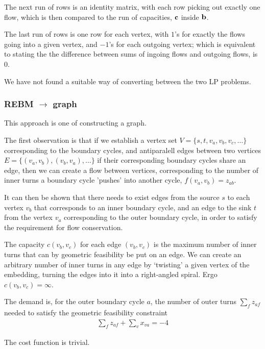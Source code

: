 The next run of rows is an identity matrix, with each row picking out exactly 
one flow, which is then compared to the run of capacities, $\bm{\mathrm{c}}$ inside $\bm{\mathrm{b}}$.

The last run of rows is one row for each vertex, with $1$'s for exactly the flows
going into a given vertex, and $-1$'s for each outgoing vertex; which is equivalent
to stating the the difference between sums of ingoing flows and outgoing flows, is $0$.

We have not found a suitable way of converting between the two LP problems.

\subsubsection{REBM $\to$ graph}

This approach is one of constructing a graph.

The first observation is that if we establish a vertex set $V = \{s, t, v_a, v_b, v_c,
\dots\}$ corresponding to the boundary cycles, and antiparalell edges between
two vertices $E = \{ (v_a, v_b), (v_b, v_a), \dots \}$ if their corresponding
boundary cycles share an edge, then we can create a flow between vertices,
corresponding to the number of inner turns a boundary cycle 'pushes' into another cycle,
$f(v_a, v_b) = z_{ab}$.

It can then be shown that there needs to exist edges from the source $s$ to each
vertex $v_b$ that corresponds to an inner boundary cycle, and an edge to the
sink $t$ from the vertex $v_a$ corresponding to the outer boundary cycle, in
order to satisfy the requirement for flow conservation.

The capacity $c(v_b, v_c)$ for each edge $(v_b, v_c)$ is the maximum number of
inner turns that can by geometric feasibility be put on an edge. We can create
an arbitrary number of inner turns in any edge by `twisting' a given vertex
of the embedding, turning the edges into it into a right-angled spiral. Ergo
$c(v_b, v_c) = \infty$.

The demand is, for the outer boundary cycle $a$, the number of outer turns $\sum_f z_{af}$ needed to
satisfy the geometric feasibility constraint
\begin{align*}
  \sum_f z_{af} + \sum_v x_{va} = -4
\end{align*}

The cost function is trivial.
